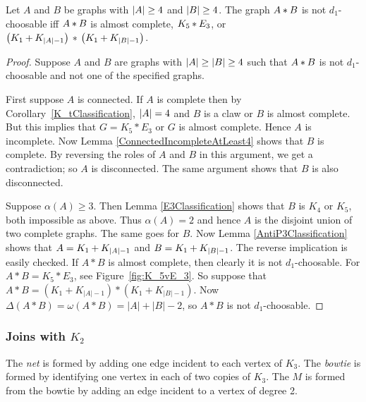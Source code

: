 \begin{lem}\label{BothSidesAtLeastFourD1Choose}
Let $A$ and $B$ be graphs with $\left|A\right| \geq 4$ and $\left|B\right| \geq 4$. The
graph $A \mbox{\hspace{2 pt}$\ast$\hspace{2 pt}} B$ is not $d_1$-choosable iff $A \mbox{\hspace{2 pt}$\ast$\hspace{2 pt}} B$ is almost complete, $K_5 \mbox{\hspace{2 pt}$\ast$\hspace{2 pt}} E_3$, or\\ \noindent $\left( K_1 \mbox{\hspace{2 pt}$+$\hspace{2 pt}} K_{\left|A\right| - 1} \right) \mbox{\hspace{2 pt}$\ast$\hspace{2 pt}} \left( K_1 \mbox{\hspace{2 pt}$+$\hspace{2 pt}} K_{\left|B\right| - 1} \right)$.
\end{lem}
\begin{proof}
Suppose $A$ and $B$ are graphs with $\left|A\right| \geq \left|B\right| \geq 4$ such that $A \mbox{\hspace{2 pt}$\ast$\hspace{2 pt}} B$ is not $d_1$-choosable and not one of the specified graphs.

First suppose $A$ is connected.  If $A$ is complete then by
Corollary~\ref{K_tClassification}, $\left|A\right| = 4$ and $B$ is a claw or $B$ is
almost complete.  But this implies that $G=K_5*E_3$ or $G$ is almost complete.
Hence $A$ is incomplete.  Now Lemma \ref{ConnectedIncompleteAtLeast4} shows that
$B$ is complete.  By reversing the roles of $A$ and $B$ in this argument, we get
a contradiction; so $A$ is disconnected.  The same argument shows that $B$ is
also disconnected.

Suppose $\alpha(A) \geq 3$.  Then Lemma \ref{E3Classification} shows that $B$ is $K_4$ or $K_5$, both impossible as above.  Thus $\alpha(A) = 2$ and hence $A$ is the disjoint union of two complete graphs.  The same goes for $B$.
Now Lemma \ref{AntiP3Classification} shows that $A = K_1 \mbox{\hspace{2 pt}$+$\hspace{2 pt}} K_{\left|A\right| - 1}$ and $B = K_1 \mbox{\hspace{2 pt}$+$\hspace{2 pt}} K_{\left|B\right| - 1}$. The reverse implication is easily checked.  If $A*B$ is almost complete, then
clearly it is not $d_1$-choosable.  For $A*B=K_5*E_3$, see
Figure~\ref{fig:K_5vE_3}.  So suppose that $A*B=(K_1+K_{|A|-1})*(K_1+K_{|B|-1})$.  Now $\Delta(A*B)=\omega(A*B) = |A|+|B|-2$, so $A*B$ is not $d_1$-choosable.
\end{proof}

\subsubsection{\texorpdfstring{Joins with $K_2$}{Joins with a 2-clique}}
\begin{defn}
The \textit{net} is formed by adding one edge incident to each vertex of $K_3$.
The \textit{bowtie} is formed by identifying one vertex in each of two copies of
$K_3$.  The $M$ is formed from the bowtie by adding an edge incident to a vertex
of degree 2.
\end{defn}

